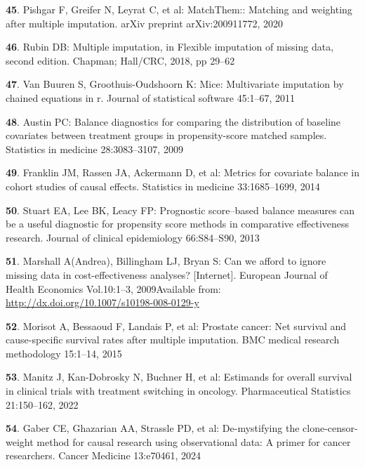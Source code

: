 \documentclass[
  letterpaper,
  DIV=11,
  numbers=noendperiod]{scrartcl}
\newlength{\cslhangindent}
\newenvironment{CSLReferences}[2] %
 {\begin{list}{}{%
  \setlength{\itemindent}{0pt}
  \setlength{\leftmargin}{0pt}
  \setlength{\parsep}{0pt}
  \ifodd #1
   \setlength{\leftmargin}{\cslhangindent}
   \setlength{\itemindent}{-1\cslhangindent}
  \fi
  \setlength{\itemsep}{#2\baselineskip}}}
 {\end{list}}
\begin{document}
\begin{CSLReferences}{0}{1}
\textbf{45}. Pishgar F, Greifer N, Leyrat C, et al: MatchThem:: Matching
and weighting after multiple imputation. arXiv preprint arXiv:200911772,
2020

\textbf{46}. Rubin DB: Multiple imputation, in Flexible imputation of
missing data, second edition. Chapman; Hall/CRC, 2018, pp 29--62

\textbf{47}. Van Buuren S, Groothuis-Oudshoorn K: Mice: Multivariate
imputation by chained equations in r. Journal of statistical software
45:1--67, 2011

\textbf{48}. Austin PC: Balance diagnostics for comparing the
distribution of baseline covariates between treatment groups in
propensity-score matched samples. Statistics in medicine 28:3083--3107,
2009

\textbf{49}. Franklin JM, Rassen JA, Ackermann D, et al: Metrics for
covariate balance in cohort studies of causal effects. Statistics in
medicine 33:1685--1699, 2014

\textbf{50}. Stuart EA, Lee BK, Leacy FP: Prognostic score--based
balance measures can be a useful diagnostic for propensity score methods
in comparative effectiveness research. Journal of clinical epidemiology
66:S84--S90, 2013

\textbf{51}. Marshall A(Andrea), Billingham LJ, Bryan S: Can we afford
to ignore missing data in cost-effectiveness analyses? {[}Internet{]}.
European Journal of Health Economics Vol.10:1--3, 2009Available from:
\url{http://dx.doi.org/10.1007/s10198-008-0129-y}

\textbf{52}. Morisot A, Bessaoud F, Landais P, et al: Prostate cancer:
Net survival and cause-specific survival rates after multiple
imputation. BMC medical research methodology 15:1--14, 2015

\textbf{53}. Manitz J, Kan-Dobrosky N, Buchner H, et al: Estimands for
overall survival in clinical trials with treatment switching in
oncology. Pharmaceutical Statistics 21:150--162, 2022

\textbf{54}. Gaber CE, Ghazarian AA, Strassle PD, et al: De-mystifying
the clone-censor-weight method for causal research using observational
data: A primer for cancer researchers. Cancer Medicine 13:e70461, 2024

\end{CSLReferences}
\end{document}

